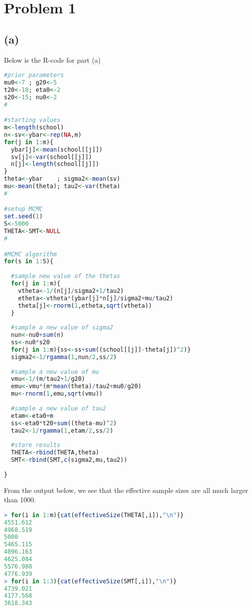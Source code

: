 \documentclass[10pt]{article}
\begin{document}
\section*{Problem 1}
\subsection*{(a)}
Below is the R-code for part (a)
\begin{lstlisting}[language=R,frame=single]
#prior parameters
mu0<-7 ; g20<-5
t20<-10; eta0<-2
s20<-15; nu0<-2
#

#starting values
m<-length(school)
n<-sv<-ybar<-rep(NA,m)
for(j in 1:m){
  ybar[j]<-mean(school[[j]])
  sv[j]<-var(school[[j]])
  n[j]<-length(school[[j]])
}
theta<-ybar    ; sigma2<-mean(sv)
mu<-mean(theta); tau2<-var(theta)
#

#setup MCMC
set.seed(1)
S<-5000
THETA<-SMT<-NULL
#

#MCMC algorithm
for(s in 1:S){
  
  #sample new value of the thetas
  for(j in 1:m){
    vtheta<-1/(n[j]/sigma2+1/tau2)
    etheta<-vtheta*(ybar[j]*n[j]/sigma2+mu/tau2)
    theta[j]<-rnorm(1,etheta,sqrt(vtheta))
  }
  
  #sample a new value of sigma2
  nun<-nu0+sum(n)
  ss<-nu0*s20
  for(j in 1:m){ss<-ss+sum((school[[j]]-theta[j])^2)}
  sigma2<-1/rgamma(1,nun/2,ss/2)
  
  #sample a new value of mu
  vmu<-1/(m/tau2+1/g20)
  emu<-vmu*(m*mean(theta)/tau2+mu0/g20)
  mu<-rnorm(1,emu,sqrt(vmu))
  
  #sample a new value of tau2
  etam<-eta0+m
  ss<-eta0*t20+sum((theta-mu)^2)
  tau2<-1/rgamma(1,etam/2,ss/2)
  
  #store results
  THETA<-rbind(THETA,theta)
  SMT<-rbind(SMT,c(sigma2,mu,tau2))
  
}
\end{lstlisting}
\par
From the output below, we see that the effective sample sizes are all much larger than 1000.
\begin{lstlisting}[language=R,frame=single]
> for(i in 1:m){cat(effectiveSize(THETA[,i]),"\n")}
4551.612 
4968.519 
5000 
5465.115 
4096.163 
4625.084 
5576.988 
4776.939 
> for(i in 1:3){cat(effectiveSize(SMT[,i]),"\n")}
4739.021 
4177.568 
3618.343 
\end{lstlisting}
\pagebreak
\end{document}
